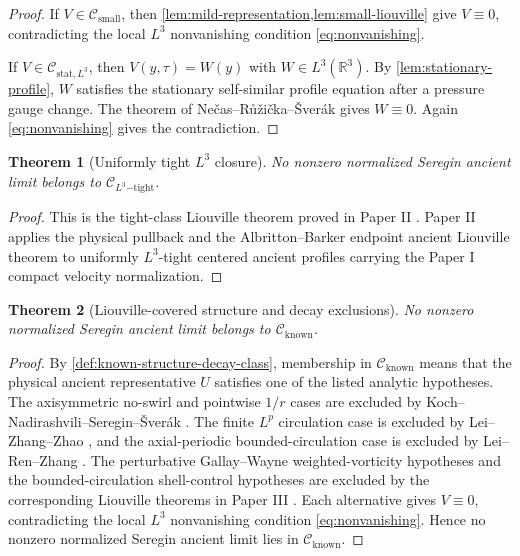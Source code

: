 \documentclass[11pt]{amsart}
\theoremstyle{plain}
\newtheorem{theorem}{Theorem}[section]
\theoremstyle{definition}
\theoremstyle{remark}
\numberwithin{equation}{section}
\newcommand{\R}{\mathbb R}
\newcommand{\calC}{\mathcal C}
\begin{document}
\begin{proof}
If \(V\in\calC_{\mathrm{small}}\), then
\cref{lem:mild-representation,lem:small-liouville} give \(V\equiv0\),
contradicting the local \(L^3\) nonvanishing condition
\eqref{eq:nonvanishing}.

If \(V\in\calC_{\mathrm{stat},L^3}\), then
\(V(y,\tau)=W(y)\) with \(W\in L^3(\R^3)\).  By
\cref{lem:stationary-profile}, \(W\) satisfies the stationary self-similar
profile equation after a pressure gauge change.
The theorem of Ne\v{c}as--R\r{u}\v{z}i\v{c}ka--\v{S}ver\'ak
\cite{NRS1996} gives \(W\equiv0\).  Again
\eqref{eq:nonvanishing} gives the contradiction.
\end{proof}

\begin{theorem}[Uniformly tight \(L^3\) closure]
\label{hyp:tight-liouville}
No nonzero normalized Seregin ancient limit belongs to
\(\calC_{L^3\mathrm{-tight}}\).
\end{theorem}

\begin{proof}
This is the tight-class Liouville theorem proved in Paper II
\cite[Corollary~\emph{Tight-class input for the residual criterion}]
{DuranPaperII}.  Paper II applies the physical pullback and the
Albritton--Barker endpoint ancient Liouville theorem to uniformly
\(L^3\)-tight centered ancient profiles carrying the Paper I compact velocity
normalization.
\end{proof}

\begin{theorem}[Liouville-covered structure and decay exclusions]
\label{thm:known-structure-decay-liouville}
No nonzero normalized Seregin ancient limit belongs to
\(\calC_{\mathrm{known}}\).
\end{theorem}

\begin{proof}
By \cref{def:known-structure-decay-class}, membership in
\(\calC_{\mathrm{known}}\) means that the physical ancient representative
\(U\) satisfies one of the listed analytic hypotheses.  The axisymmetric
no-swirl and pointwise \(1/r\) cases are excluded by
Koch--Nadirashvili--Seregin--\v{S}ver\'ak \cite{KNSS2009}.  The finite
\(L^p\) circulation case is excluded by Lei--Zhang--Zhao \cite{LZZ2017}, and
the axial-periodic bounded-circulation case is excluded by Lei--Ren--Zhang
\cite{LRZ2022}.  The perturbative Gallay--Wayne weighted-vorticity hypotheses
and the bounded-circulation shell-control hypotheses are excluded by the
corresponding Liouville theorems in Paper III \cite{DuranPaperIII}.  Each
alternative gives \(V\equiv0\), contradicting the local \(L^3\) nonvanishing
condition \eqref{eq:nonvanishing}.  Hence no nonzero normalized Seregin
ancient limit lies in \(\calC_{\mathrm{known}}\).
\end{proof}
\end{document}
